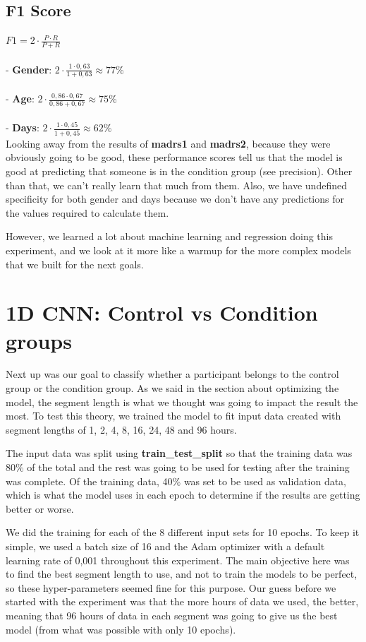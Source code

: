 \subsection{F1 Score}
$ F1 = 2 \cdot \frac{P \cdot R}{P + R} $
\\\\
- \textbf{Gender}: $2 \cdot \frac{1 \cdot 0,63}{1 + 0,63} \approx 77\%$\\\\
- \textbf{Age}: $2 \cdot \frac{0,86 \cdot 0,67}{0,86 + 0,67} \approx 75\%$\\\\
- \textbf{Days}: $2 \cdot \frac{1 \cdot 0,45}{1 + 0,45} \approx 62\%$\\

Looking away from the results of \textbf{madrs1} and \textbf{madrs2}, because they were obviously going to be good, these performance scores tell us that the model 
is good at predicting that someone is in the condition group (see precision). Other than that, we can't really learn that much from them. 
Also, we have undefined specificity for both gender and days because we don't have any predictions for the values required to calculate them. 

However, we learned a lot about machine learning and regression doing this experiment, and we look at it more like a warmup for the more complex models that we built 
for the next goals.

\section{1D CNN: Control vs Condition groups}

Next up was our goal to classify whether a participant belongs to the control group or the condition group. 
As we said in the section about optimizing the model, the segment length is what we thought was going to impact the result the most. 
To test this theory, we trained the model to fit input data created with segment lengths of 1, 2, 4, 8, 16, 24, 48 and 96 hours. 

The input data was split using \textbf{train\_test\_split} so that the training data was 80\% of the total and the rest was going to be used for 
testing after the training was complete. Of the training data, 40\% was set to be used as validation data, which is what the model uses in 
each epoch to determine if the results are getting better or worse. 

We did the training for each of the 8 different input sets for 10 epochs. To keep it simple, we used a batch size of 16 and 
the Adam optimizer with a default learning rate of 0,001 throughout this experiment. The main objective here was to find the best segment length to use, 
and not to train the models to be perfect, so these hyper-parameters seemed fine for this purpose. Our guess before we started with the experiment was 
that the more hours of data we used, the better, meaning that 96 hours of data in each segment was going to give us the best model 
(from what was possible with only 10 epochs). 

